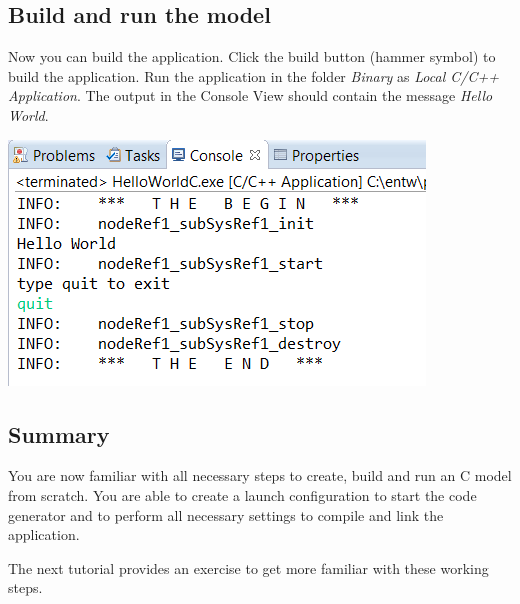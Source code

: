 \subsection{Build and run the model}

Now you can build the application. Click the build button (hammer symbol) to build the application.
Run the application in the folder \emph{Binary} as \textit{Local C/C++ Application}.
The output in the Console View should contain the message \emph{Hello World}.

\includegraphics{images/016-HelloWorldC16.png}



\subsection{Summary}

You are now familiar with all necessary steps to create, build and run an \eTrice{} C model from scratch. You 
are able to create a launch configuration to start the code generator and to perform all necessary 
settings to compile and link the application.  

The next tutorial provides an exercise to get more familiar with these working steps.
